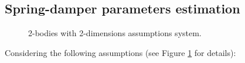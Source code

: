 \documentclass[\main/main.tex]{subfiles}
\begin{document}
%


\subsection{Spring-damper parameters estimation}

\begin{figure}[H]
\centering
   \caption{2-bodies with 2-dimensions assumptions system.}
   \label{fig:tikz:2_bodies}
\end{figure}

Considering the following assumptions (see Figure \ref{fig:tikz:2_bodies} for details):
\end{document}
